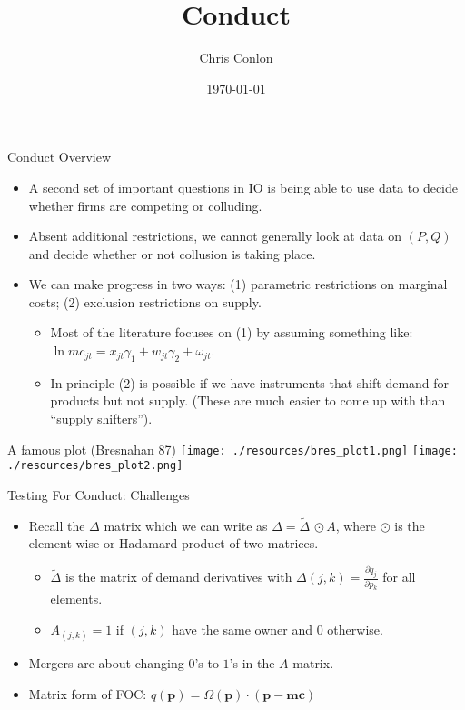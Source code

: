 \documentclass[xcolor=pdftex,dvipsnames,table,mathserif,aspectratio=169]{beamer}
\begin{document}
\title{Conduct}
\author{Chris Conlon}
\date{\today}

\frame{\titlepage}

\begin{frame}{Conduct Overview}
\begin{itemize}
\item A second set of important questions in IO is being able to use data to decide whether firms are \alert{competing} or \alert{colluding}.
\item Absent additional restrictions, we cannot generally look at data on $(P,Q)$ and decide whether or not collusion is taking place.
\item We can make progress in two ways: (1) parametric restrictions on marginal costs; (2) exclusion restrictions on supply.
\begin{itemize}
\item Most of the literature focuses on (1) by assuming something like: $\ln mc_{jt} = x_{jt} \gamma_1 + w_{jt} \gamma_2 + \omega_{jt}$.
\item In principle (2) is possible if we have instruments that shift demand for products but not supply. (These are much easier to come up with than ``supply shifters'').
\end{itemize}
\end{itemize}
\end{frame}

\begin{frame}{A famous plot (Bresnahan 87)}
\texttt{[image: ./resources/bres\_plot1.png]}
\texttt{[image: ./resources/bres\_plot2.png]}
\end{frame}



\begin{frame}{Testing For Conduct: Challenges}
\begin{itemize}
\item Recall the $\Delta$ matrix which we can write as $\Delta=\tilde{\Delta}\, \odot A$, where $\odot$ is the element-wise or Hadamard product of two matrices. 
\begin{itemize}
\item $\tilde{\Delta}$ is the matrix of demand derivatives with $\Delta{(j,k)} = \frac{\partial q_j}{\partial p_k}$ for all elements.
\item $A_{(j,k)} =1$ if $(j,k)$ have the same owner and $0$ otherwise.
\end{itemize}
\item Mergers are about changing $0$'s to $1$'s in the $A$ matrix.
\item Matrix form of FOC: $q(\mathbf{p}) = \Omega(\mathbf{p})\cdot(\mathbf{p}-\mathbf{mc})$
\end{itemize}
\end{frame}
\end{document}
